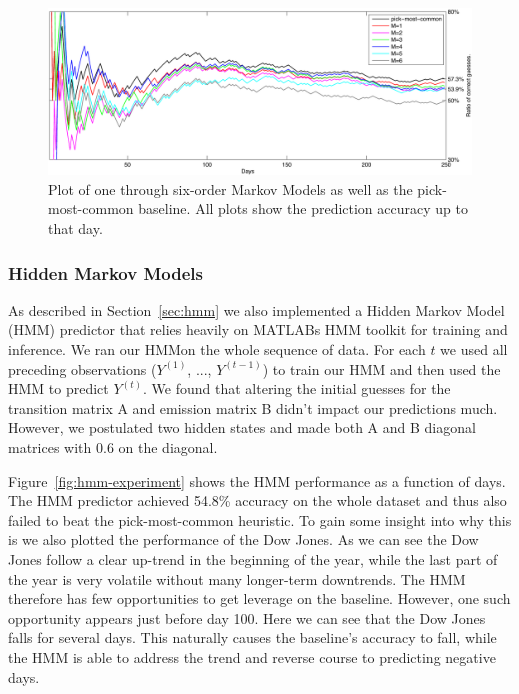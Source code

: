 \documentclass[10pt, twocolumn]{article}
\begin{document}
\begin{figure}
\center
\hspace{0.5cm}
\includegraphics[width=16cm]{experiments/mm_experiment.pdf}
\caption{Plot of one through six-order Markov Models as well as the pick-most-common baseline. All plots show the prediction accuracy up to that day.}
\label{fig:mm-experiment}
\end{figure}

\subsubsection{Hidden Markov Models}
\label{hmm-eval}

As described in Section~\ref{sec:hmm} we also implemented a Hidden Markov Model (HMM) predictor that relies heavily on MATLABs HMM toolkit for training and inference.
We ran our HMMon the whole sequence of data. For each $t$ we used all preceding observations ($Y^{(1)}$, ..., $Y^{(t-1)}$) to train our HMM and then used the HMM to predict $Y^{(t)}$.
We found that altering the initial guesses for the transition matrix A and emission matrix B didn't impact our predictions much.
However, we postulated two hidden states and made both A and B diagonal matrices with 0.6 on the diagonal.

Figure~\ref{fig:hmm-experiment} shows the HMM performance as a function of days.
The HMM predictor achieved 54.8\% accuracy on the whole dataset and thus also failed to beat the pick-most-common heuristic.
To gain some insight into why this is we also plotted the performance of the Dow Jones.
As we can see the Dow Jones follow a clear up-trend in the beginning of the year, while the last part of the year is very volatile without many longer-term downtrends.
The HMM therefore has few opportunities to get leverage on the baseline.
However, one such opportunity appears just before day 100. Here we can see that the Dow Jones falls for several days. This naturally causes the baseline's accuracy to fall, while the HMM is able to address the trend and reverse course to predicting negative days.
\end{document}
